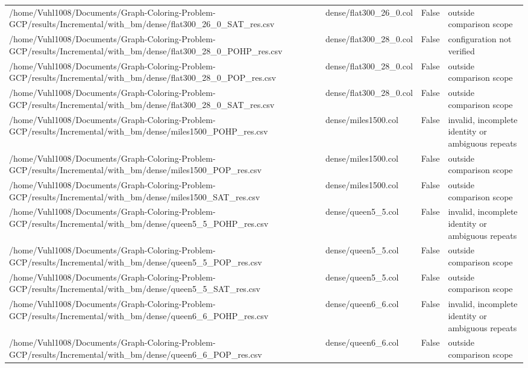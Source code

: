 \begin{table}[htbp]
\begin{tabular}{llll}
/home/Vuhl1008/Documents/Graph-Coloring-Problem-GCP/results/Incremental/with\_bm/dense/flat300\_26\_0\_SAT\_res.csv & dense/flat300\_26\_0.col & False & outside comparison scope \\
/home/Vuhl1008/Documents/Graph-Coloring-Problem-GCP/results/Incremental/with\_bm/dense/flat300\_28\_0\_POHP\_res.csv & dense/flat300\_28\_0.col & False & configuration not verified \\
/home/Vuhl1008/Documents/Graph-Coloring-Problem-GCP/results/Incremental/with\_bm/dense/flat300\_28\_0\_POP\_res.csv & dense/flat300\_28\_0.col & False & outside comparison scope \\
/home/Vuhl1008/Documents/Graph-Coloring-Problem-GCP/results/Incremental/with\_bm/dense/flat300\_28\_0\_SAT\_res.csv & dense/flat300\_28\_0.col & False & outside comparison scope \\
/home/Vuhl1008/Documents/Graph-Coloring-Problem-GCP/results/Incremental/with\_bm/dense/miles1500\_POHP\_res.csv & dense/miles1500.col & False & invalid, incomplete identity or ambiguous repeats \\
/home/Vuhl1008/Documents/Graph-Coloring-Problem-GCP/results/Incremental/with\_bm/dense/miles1500\_POP\_res.csv & dense/miles1500.col & False & outside comparison scope \\
/home/Vuhl1008/Documents/Graph-Coloring-Problem-GCP/results/Incremental/with\_bm/dense/miles1500\_SAT\_res.csv & dense/miles1500.col & False & outside comparison scope \\
/home/Vuhl1008/Documents/Graph-Coloring-Problem-GCP/results/Incremental/with\_bm/dense/queen5\_5\_POHP\_res.csv & dense/queen5\_5.col & False & invalid, incomplete identity or ambiguous repeats \\
/home/Vuhl1008/Documents/Graph-Coloring-Problem-GCP/results/Incremental/with\_bm/dense/queen5\_5\_POP\_res.csv & dense/queen5\_5.col & False & outside comparison scope \\
/home/Vuhl1008/Documents/Graph-Coloring-Problem-GCP/results/Incremental/with\_bm/dense/queen5\_5\_SAT\_res.csv & dense/queen5\_5.col & False & outside comparison scope \\
/home/Vuhl1008/Documents/Graph-Coloring-Problem-GCP/results/Incremental/with\_bm/dense/queen6\_6\_POHP\_res.csv & dense/queen6\_6.col & False & invalid, incomplete identity or ambiguous repeats \\
/home/Vuhl1008/Documents/Graph-Coloring-Problem-GCP/results/Incremental/with\_bm/dense/queen6\_6\_POP\_res.csv & dense/queen6\_6.col & False & outside comparison scope \\

\end{tabular}
\end{table}
